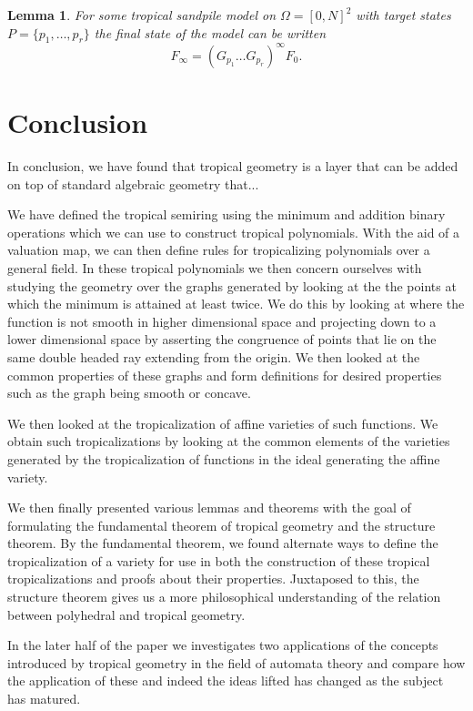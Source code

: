 \documentclass[12pt,a4paper]{amsart}
\newtheorem{lem}[thm]{Lemma}
\theoremstyle{definition}
\theoremstyle{remark}
\begin{document}
\begin{lem}
For some tropical sandpile model on $\Omega = [0,N]^2$ with target states $P=\{ p_1,\dots,p_r \}$ the final state of the model can be written 
\begin{equation}
    F_\infty = (G_{p_1}\dots G_{p_r})^\infty F_0.
\end{equation}
\end{lem}

\section*{Conclusion}

In conclusion, we have found that tropical geometry is a layer that can be added on top of standard algebraic geometry that...

We have defined the tropical semiring using the minimum and addition binary operations which we can use to construct tropical polynomials. With the aid of a valuation map, we can then define rules for tropicalizing polynomials over a general field. In these tropical polynomials we then concern ourselves with studying the geometry over the graphs generated by looking at the the points at which the minimum is attained at least twice. We do this by looking at where the function is not smooth in higher dimensional space and projecting down to a lower dimensional space by asserting the congruence of points that lie on the same double headed ray extending from the origin. We then looked at the common properties of these graphs and form definitions for desired properties such as the graph being smooth or concave.

We then looked at the tropicalization of affine varieties of such functions. We obtain such tropicalizations by looking at the common elements of the varieties generated by the tropicalization of functions in the ideal generating the affine variety.

We then finally presented various lemmas and theorems with the goal of formulating the fundamental theorem of tropical geometry and the structure theorem.
By the fundamental theorem, we found alternate ways to define the tropicalization of a variety for use in both the construction of these tropical tropicalizations and proofs about their properties.
Juxtaposed to this, the structure theorem gives us a more philosophical understanding of the relation between polyhedral and tropical geometry.

In the later half of the paper we investigates two applications of the concepts introduced by tropical geometry in the field of automata theory and compare how the application of these and indeed the ideas lifted has changed as the subject has matured.
\end{document}
